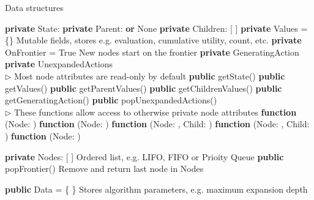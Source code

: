 \begin{algorithm}[H]
    \caption{Data structures}
    \label{alg:general_tree_search_data}
    \begin{algorithmic}[1]
            \State \textbf{private} State: 
            \State \textbf{private} Parent:  \textbf{or} None
            \State \textbf{private} Children: [ ]
            \State \textbf{private} Values = \{\}
            \Comment Mutable fields, stores e.g. evaluation, cumulative utility, count, etc.
            \State \textbf{private} OnFrontier = True            
            \Comment New nodes start on the frontier
            \State \textbf{private} GeneratingAction
            \State \textbf{private} UnexpandedActions
            \\
            \State $\rhd$ Most node attributes are read-only by default
            \State \textbf{public} getState()
            \State \textbf{public} getValues()
            \State \textbf{public} getParentValues()
            \State \textbf{public} getChildrenValues()
            \State \textbf{public} getGeneratingAction()
            \State \textbf{public} popUnexpandedActions()
        \EndObj
        \\
        \State $\rhd$ These functions allow access to otherwise private node attributes
        \State \textbf{function} (Node: )
        \State \textbf{function} (Node: )
        \State \textbf{function} (Node: , Child: )
        \State \textbf{function} (Node: , Child: )
        \State \textbf{function} (Node: )
    \end{algorithmic}
    \vspace{.25cm}
    \begin{algorithmic}[1]
            \State \textbf{private} Nodes: [ ]
            \Comment Ordered list, e.g. LIFO, FIFO or Prioity Queue
            \State \textbf{public} popFrontier()
            \Comment Remove and return last node in Nodes
            \EndObj
    \end{algorithmic}
    \vspace{.25cm}
    \begin{algorithmic}[1]
            \State \textbf{public} Data = \{ \}
            \Comment Stores algorithm parameters, e.g. maximum expansion depth
        \EndObj
    \end{algorithmic}
\end{algorithm}